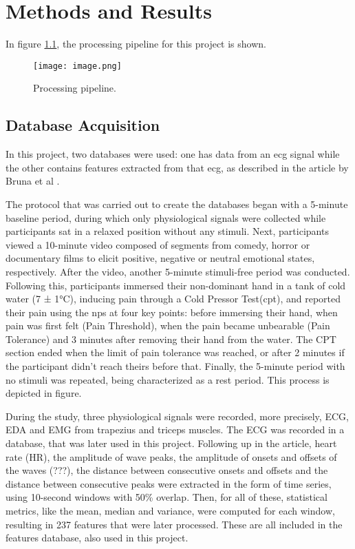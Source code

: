 \chapter{Methods and Results}
\label{chapter:methods}

In figure \ref{fig:image}, the processing pipeline for this project is shown.

\begin{figure}[h!]
    \centering
    \texttt{[image: image.png]}
    \caption{Processing pipeline.}
    \label{fig:image}
\end{figure}

\section{Database Acquisition}
In this project, two databases were used: one has data from an \ac{ecg} signal while the other contains features extracted from that \ac{ecg}, as described in the article by Bruna et al \cite{Alves2024}.

The protocol that was carried out to create the databases began with a 5-minute baseline period, during which only physiological signals were collected while participants sat in a relaxed position without any stimuli. 
Next, participants viewed a 10-minute video composed of segments from comedy, horror or documentary films to elicit positive, negative or neutral emotional states, respectively. 
After the video, another 5-minute stimuli-free period was conducted. 
Following this, participants immersed their non-dominant hand in a tank of cold water (7 ± 1°C), inducing pain through a Cold Pressor Test(\ac{cpt}), and reported their pain using the \ac{nps} at four key points: before immersing their hand, when pain was first felt (Pain Threshold), when the pain became unbearable (Pain Tolerance) and 3 minutes after removing their hand from the water. 
The CPT section ended when the limit of pain tolerance was reached, or after 2 minutes if the participant didn’t reach theirs before that. 
Finally, the 5-minute period with no stimuli was repeated, being characterized as a rest period. This process is depicted in figure. 

During the study, three physiological signals were recorded, more precisely, ECG, EDA and EMG from trapezius and triceps muscles. The ECG was recorded in a database, that was later used in this project.
Following up in the article, heart rate (HR), the amplitude of wave peaks, the amplitude of onsets and offsets of the waves (???), the distance between consecutive onsets and offsets and the distance between consecutive peaks were extracted in the form of time series, using 10-second windows with 50\% overlap. 
Then, for all of these, statistical metrics, like the mean, median and variance, were computed for each window, resulting in 237 features that were later processed. These are all included in the features database, also used in this project.



